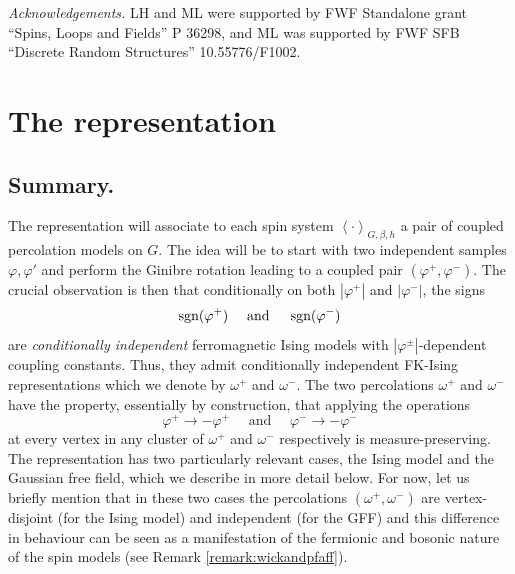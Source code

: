 \documentclass{article}
\numberwithin{equation}{section}
\theoremstyle{definition}
\theoremstyle{definition}
\theoremstyle{remark}
\DeclareMathOperator{\sgn}{\textnormal{sgn}}
\newcommand\vp{\varphi}
\newcommand{\w}{\omega}
\newcommand{\vpp}{\vp^+}
\newcommand{\vpm}{\vp^-}
\begin{document}




\noindent\emph{Acknowledgements.}
LH and ML were supported by FWF Standalone grant ``Spins, Loops and Fields'' P 36298, and ML was supported by FWF SFB ``Discrete Random Structures'' 10.55776/F1002.

\section{The representation}\label{sec:therep}
\subsection{Summary. }The representation will associate to each spin system $\left< \cdot \right>_{G,\beta,h}$ a pair of coupled percolation models on $G$. The idea will be to start with two independent samples $\vp,\vp'$ and perform the Ginibre rotation leading to a coupled pair $(\vp^+,\vp^-)$.
The crucial observation is then that conditionally on both $|\vpp|$ and $|\vpm|$, the signs
\[
\sgn(\vpp) \quad\text{ and }\quad \sgn(\vpm)
\] 
are \emph{conditionally independent} ferromagnetic Ising models with $|\vp^{\pm}|$-dependent coupling constants.
Thus, they admit conditionally independent FK-Ising representations which we denote by $\w^+$ and $\w^-$.
The two percolations $\w^+$ and $\w^-$ have the property, essentially by construction, that applying the operations 
\[
	\vp^+ \to -\vp^+ \quad \text{ and }\quad \vp^- \to -\vp^-
\]
at every vertex in any cluster of $\w^+$ and $\w^-$ respectively is measure-preserving. 
\\[1em]
\noindent The representation has two particularly relevant cases, the Ising model and the Gaussian free field, which we describe in more detail below. For now, let us briefly mention that in these two cases the percolations $(\w^+,\w^-)$ are vertex-disjoint (for the Ising model) and independent (for the GFF) and this difference in behaviour can be seen as a manifestation of the fermionic and bosonic nature of the spin models (see Remark \ref{remark:wickandpfaff}).
\end{document}
